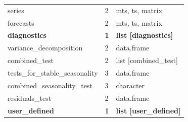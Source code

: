 \documentclass[article]{jss}
\begin{document}
\begin{longtable}{lll}
\addlinespace
\hspace{2em}series & 2 & mts, ts, matrix\\
\hspace{2em}forecasts & 2 & mts, ts, matrix\\
\textbf{\hspace{1em}diagnostics} & \textbf{1} & \textbf{list [diagnostics]}\\
\hspace{2em}variance\_decomposition & 2 & data.frame\\
\hspace{2em}combined\_test & 2 & list [combined\_test]\\
\addlinespace
\hspace{3em}tests\_for\_stable\_seasonality & 3 & data.frame\\
\hspace{3em}combined\_seasonality\_test & 3 & character\\
\hspace{2em}residuals\_test & 2 & data.frame\\
\textbf{\hspace{1em}user\_defined} & \textbf{1} & \textbf{list [user\_defined]}\\
\bottomrule
\end{longtable}
\end{document}
